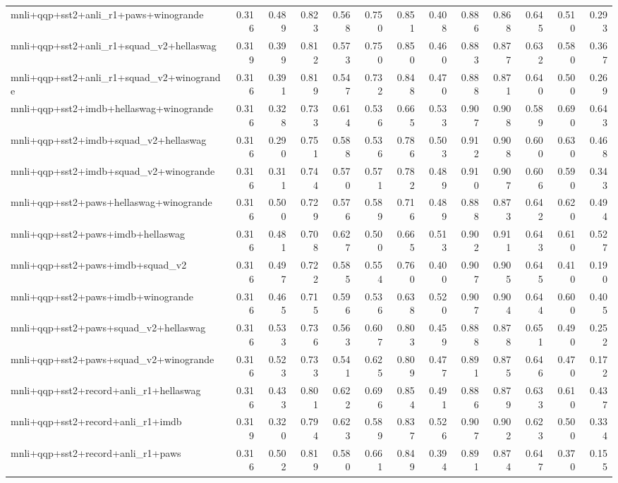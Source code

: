\begin{table}[t]
\begin{tabular}{lrrrrrrrrrrrr}
    mnli+qqp+sst2+anli\_r1+paws+winogrande & 0.316 & 0.489 & 0.823 & 0.568 & 0.750 & 0.851 & 0.408 & 0.886 & 0.868 & 0.645 & 0.510 & 0.293 \\
    mnli+qqp+sst2+anli\_r1+squad\_v2+hellaswag & 0.319 & 0.399 & 0.812 & 0.573 & 0.750 & 0.850 & 0.460 & 0.883 & 0.877 & 0.632 & 0.580 & 0.367 \\
    mnli+qqp+sst2+anli\_r1+squad\_v2+winogrande & 0.316 & 0.391 & 0.819 & 0.547 & 0.732 & 0.848 & 0.470 & 0.888 & 0.871 & 0.640 & 0.500 & 0.269 \\
    mnli+qqp+sst2+imdb+hellaswag+winogrande & 0.316 & 0.328 & 0.733 & 0.614 & 0.536 & 0.665 & 0.533 & 0.907 & 0.908 & 0.589 & 0.690 & 0.643 \\
    mnli+qqp+sst2+imdb+squad\_v2+hellaswag & 0.316 & 0.290 & 0.751 & 0.588 & 0.536 & 0.786 & 0.503 & 0.912 & 0.908 & 0.600 & 0.630 & 0.468 \\
    mnli+qqp+sst2+imdb+squad\_v2+winogrande & 0.316 & 0.311 & 0.744 & 0.570 & 0.571 & 0.782 & 0.489 & 0.910 & 0.907 & 0.606 & 0.590 & 0.343 \\
    mnli+qqp+sst2+paws+hellaswag+winogrande & 0.316 & 0.500 & 0.729 & 0.576 & 0.589 & 0.716 & 0.489 & 0.888 & 0.873 & 0.642 & 0.620 & 0.494 \\
    mnli+qqp+sst2+paws+imdb+hellaswag & 0.316 & 0.481 & 0.708 & 0.627 & 0.500 & 0.665 & 0.513 & 0.902 & 0.911 & 0.643 & 0.610 & 0.527 \\
    mnli+qqp+sst2+paws+imdb+squad\_v2 & 0.316 & 0.497 & 0.722 & 0.585 & 0.554 & 0.760 & 0.400 & 0.907 & 0.905 & 0.645 & 0.410 & 0.190 \\
    mnli+qqp+sst2+paws+imdb+winogrande & 0.316 & 0.465 & 0.715 & 0.596 & 0.536 & 0.638 & 0.520 & 0.907 & 0.904 & 0.644 & 0.600 & 0.405 \\
    mnli+qqp+sst2+paws+squad\_v2+hellaswag & 0.316 & 0.533 & 0.736 & 0.563 & 0.607 & 0.803 & 0.459 & 0.888 & 0.878 & 0.651 & 0.490 & 0.252 \\
    mnli+qqp+sst2+paws+squad\_v2+winogrande & 0.316 & 0.523 & 0.733 & 0.541 & 0.625 & 0.809 & 0.477 & 0.891 & 0.875 & 0.646 & 0.470 & 0.172 \\
    mnli+qqp+sst2+record+anli\_r1+hellaswag & 0.316 & 0.433 & 0.801 & 0.622 & 0.696 & 0.854 & 0.491 & 0.886 & 0.879 & 0.633 & 0.610 & 0.437 \\
    mnli+qqp+sst2+record+anli\_r1+imdb & 0.319 & 0.320 & 0.794 & 0.623 & 0.589 & 0.837 & 0.526 & 0.907 & 0.902 & 0.623 & 0.500 & 0.334 \\
    mnli+qqp+sst2+record+anli\_r1+paws & 0.316 & 0.502 & 0.819 & 0.580 & 0.661 & 0.849 & 0.394 & 0.891 & 0.874 & 0.647 & 0.370 & 0.155 \\

\end{tabular}
\end{table}
